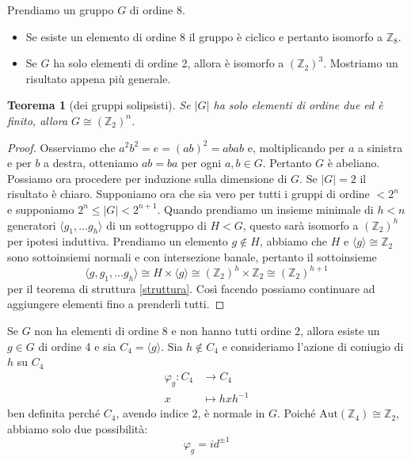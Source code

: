 \documentclass[a4paper]{article}
\newtheorem{theorem}{Teorema}[section]
\theoremstyle{remark}
\theoremstyle{definition}
\newcommand{\Aut}[1]{\mathrm{Aut}\left( #1 \right)}
\newcommand{\fun}[5]{\begin{align*}
	#1 \colon #2 &\to #3 \\
	#4 &\mapsto #5
	\end{align*}}
\begin{document}
\begin{multicols}{2}
	Prendiamo un gruppo $ G $ di ordine 8.
\begin{itemize}
	\item Se esiste un elemento di ordine 8 il gruppo è ciclico e pertanto isomorfo a $ \mathbb{Z}_8 $.
	\item Se $ G $ ha solo elementi di ordine 2, allora è isomorfo a $ \left(\mathbb{Z}_2\right)^3 $. Mostriamo un risultato appena più generale. 
\end{itemize}
\begin{theorem}[dei gruppi solipsisti]
	Se $ |G| $ ha solo elementi di ordine due ed è finito, allora $ G \cong \left(\mathbb{Z}_2\right)^n $.
\end{theorem}
\begin{proof}
	Osserviamo che $ a^2b^2 = e = (ab)^2 = abab $ e, moltiplicando per $ a $ a sinistra e per $ b $ a destra, otteniamo $ ab = ba $ per ogni $ a, b \in G $. Pertanto $ G $ è abeliano. Possiamo ora procedere per induzione sulla dimensione di $ G $. Se $ |G| = 2 $ il risultato è chiaro. Supponiamo ora che sia vero per tutti i gruppi di ordine $ < 2^n $ e supponiamo $ 2^ n \leq |G| < 2^{n+1} $. Quando prendiamo un insieme minimale di $ h < n $ generatori $ \langle g_1, \dots g_h \rangle $ di un sottogruppo di $ H < G $, questo sarà isomorfo a $ \left(\mathbb{Z}_2\right)^h $ per ipotesi induttiva. Prendiamo un elemento $ g \notin H$, abbiamo che $ H $ e $ \langle g \rangle \cong \mathbb{Z}_2 $ sono sottoinsiemi normali e con intersezione banale, pertanto il sottoinsieme \[ \langle g, g_1, \dots g_h \rangle \cong H \times\langle g \rangle \cong \left(\mathbb{Z}_2\right)^h \times \mathbb{Z}_2 \cong \left(\mathbb{Z}_2\right)^{h+1} \]
	per il teorema di struttura \ref{struttura}.
	Così facendo possiamo continuare ad aggiungere elementi fino a prenderli tutti.
\end{proof}
Se $ G $ non ha elementi di ordine $ 8 $ e non hanno tutti ordine $ 2 $, allora esiste un $ g \in G $ di ordine 4 e sia $ C_4 = \langle g \rangle $. Sia $ h \notin C_4 $ e consideriamo l'azione di coniugio di $ h $ su $ C_4 $
\fun{\varphi_g}{C_4}{C_4}{x}{hxh^{-1}}
ben definita perché $ C_4 $, avendo indice $ 2 $, è normale in $ G $. Poiché $ \Aut{\mathbb{Z}_4} \cong \mathbb{Z}_2 $, abbiamo solo due possibilità: $$  \varphi_g =  id^{\pm 1}  $$


\end{multicols}
\end{document}
